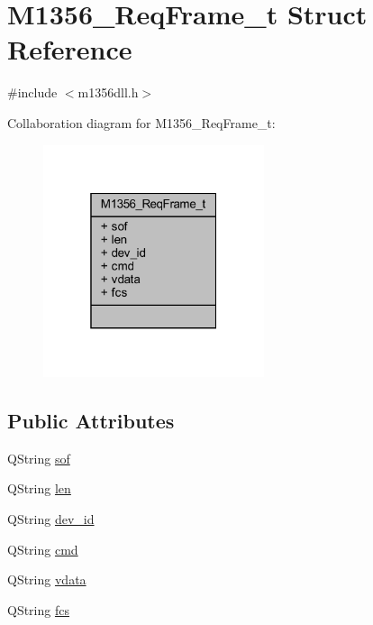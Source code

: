 \hypertarget{struct_m1356___req_frame__t}{}\section{M1356\+\_\+\+Req\+Frame\+\_\+t Struct Reference}
\label{struct_m1356___req_frame__t}


{\ttfamily \#include $<$m1356dll.\+h$>$}



Collaboration diagram for M1356\+\_\+\+Req\+Frame\+\_\+t\+:\nopagebreak
\begin{figure}[H]
\begin{center}
\leavevmode
\includegraphics[width=184pt]{struct_m1356___req_frame__t__coll__graph}
\end{center}
\end{figure}
\subsection*{Public Attributes}
\begin{DoxyCompactItemize}
\item 
Q\+String \mbox{\hyperlink{struct_m1356___req_frame__t_a715b08f85ea36a3068f0508c2da869c9}{sof}}
\item 
Q\+String \mbox{\hyperlink{struct_m1356___req_frame__t_a8f1079624d94a8dffa53a741fce6a124}{len}}
\item 
Q\+String \mbox{\hyperlink{struct_m1356___req_frame__t_aa531579caee64e843b085ee3d2efbe2f}{dev\+\_\+id}}
\item 
Q\+String \mbox{\hyperlink{struct_m1356___req_frame__t_a60ee2d57c068e5b4e275e6a2d76b2177}{cmd}}
\item 
Q\+String \mbox{\hyperlink{struct_m1356___req_frame__t_afdc84411b144531c4f7270f323fd9e40}{vdata}}
\item 
Q\+String \mbox{\hyperlink{struct_m1356___req_frame__t_aee257c4e782fb78f8825bb7cba34f742}{fcs}}
\end{DoxyCompactItemize}


